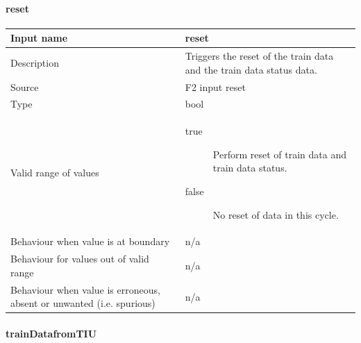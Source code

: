 \paragraph{reset}

\begin{longtable}{p{}p{}}
\toprule
Input name				& reset \\
\midrule
Description				& Triggers the reset of the train data and the train data status data.\\
\midrule
Source					& F2 input reset\\ 
\midrule
Type					& bool \\
\midrule
Valid range of values	& 
\begin{description}
\item[true] Perform reset of train data and train data status.
\item[false] No reset of data in this cycle.
\end{description}
\\
\midrule
Behaviour when value is at boundary	& n/a \\
\midrule
Behaviour for values out of valid range	& n/a \\
\midrule
Behaviour when value is erroneous, absent or unwanted (i.e. spurious) & n/a \\
\bottomrule
\end{longtable}

\paragraph{trainDatafromTIU}

